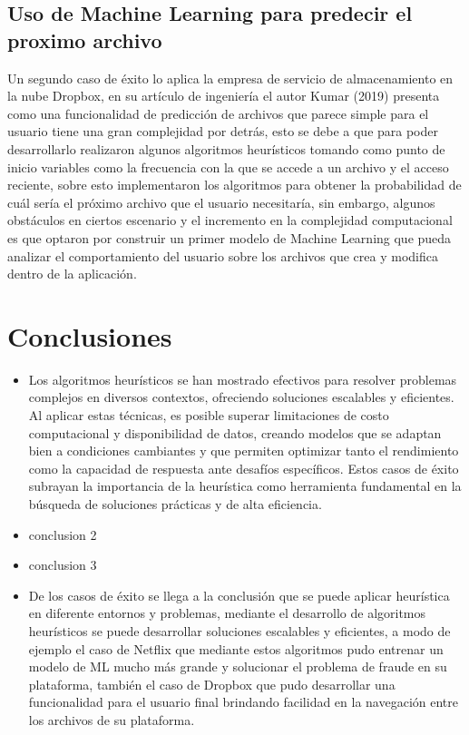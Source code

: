 \documentclass[9pt,a4paper,twoside]{rho-class/rho}
\begin{document}
    \subsection{Uso de Machine Learning para predecir el proximo archivo}
        Un segundo caso de éxito lo aplica la empresa de servicio de almacenamiento en la nube Dropbox, en su artículo de ingeniería el autor Kumar (2019) presenta como una funcionalidad de predicción de archivos que parece simple para el usuario tiene una gran complejidad por detrás, esto se debe a que para poder desarrollarlo realizaron algunos algoritmos heurísticos tomando como punto de inicio variables como la frecuencia con la que se accede a un archivo y el acceso reciente, sobre esto implementaron los algoritmos para obtener la probabilidad de cuál sería el próximo archivo que el usuario necesitaría, sin embargo, algunos obstáculos en ciertos escenario y el incremento en la complejidad computacional es que optaron por construir un primer modelo de Machine Learning que pueda analizar el comportamiento del usuario sobre los archivos que crea y modifica dentro de la aplicación.

\section{Conclusiones}
    \begin{itemize}
        \item Los algoritmos heurísticos se han mostrado efectivos para resolver problemas complejos en diversos contextos, ofreciendo soluciones escalables y eficientes. Al aplicar estas técnicas, es posible superar limitaciones de costo computacional y disponibilidad de datos, creando modelos que se adaptan bien a condiciones cambiantes y que permiten optimizar tanto el rendimiento como la capacidad de respuesta ante desafíos específicos. Estos casos de éxito subrayan la importancia de la heurística como herramienta fundamental en la búsqueda de soluciones prácticas y de alta eficiencia.
        \item conclusion 2
        \item conclusion 3
        \item De los casos de éxito se llega a la conclusión que se puede aplicar heurística en diferente entornos y problemas, mediante el desarrollo de algoritmos heurísticos se puede desarrollar soluciones escalables y eficientes, a modo de ejemplo el caso de Netflix que mediante estos algoritmos pudo entrenar un modelo de ML mucho más grande y solucionar el problema de fraude en su plataforma, también el caso de Dropbox que pudo desarrollar una funcionalidad para el usuario final brindando facilidad en la navegación entre los archivos de su plataforma.
    \end{itemize}
\end{document}
